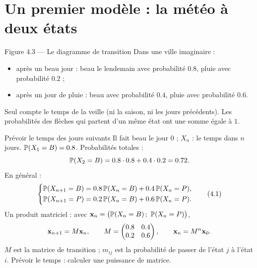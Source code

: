 \section{Un premier modèle : la météo à deux états}

\begin{frame}{Figure 4.3 --- Le diagramme de transition}
  \small Dans une ville imaginaire :
  \begin{itemize}
    \item après un beau jour : beau le lendemain avec probabilité
      $\num{0.8}$, pluie avec probabilité $\num{0.2}$ ;
    \item après un jour de pluie : beau avec probabilité $\num{0.4}$,
      pluie avec probabilité $\num{0.6}$.
  \end{itemize}
  Seul compte le temps de la veille (ni la saison, ni les jours
  précédents).
  \small Les probabilités des flèches qui partent d'un même état ont une
  somme égale à $1$.
\end{frame}

\begin{frame}{Prévoir le temps des jours suivants}
  \small Il fait beau le jour $0$ ; $X_n$ : le temps dans $n$ jours.
  $\mathbb{P}\mathopen{}\left(X_1=B\right)\mathclose{}=\num{0.8}$. Probabilités totales :
  \[
    \mathbb{P}\mathopen{}\left(X_2=B\right)\mathclose{} = \num{0.8}\cdot\num{0.8}+\num{0.4}\cdot\num{0.2} = \num{0.72}.
  \]
  En général :
  \[
    \left\{\begin{aligned}
      \mathbb{P}\mathopen{}\left(X_{n+1}=B\right)\mathclose{} &= \num{0.8}\,\mathbb{P}\mathopen{}\left(X_n=B\right)\mathclose{}+\num{0.4}\,\mathbb{P}\mathopen{}\left(X_n=P\right)\mathclose{},\\
      \mathbb{P}\mathopen{}\left(X_{n+1}=P\right)\mathclose{} &= \num{0.2}\,\mathbb{P}\mathopen{}\left(X_n=B\right)\mathclose{}+\num{0.6}\,\mathbb{P}\mathopen{}\left(X_n=P\right)\mathclose{}.
    \end{aligned}\right. \tag{4.1}
  \]
  Un produit matriciel : avec $\vec x_n=\big(\P{X_n=B}\,;\ \P{X_n=P}\big)$,
  \[
    \mathbf{x}_{n+1} = M\mathbf{x}_n,\qquad
    M = \begin{pmatrix}\num{0.8} & \num{0.4}\\ \num{0.2} & \num{0.6}\end{pmatrix},\qquad
    \mathbf{x}_n = M^n\mathbf{x}_0 .
  \]
  $M$ est la matrice de transition ; $m_{ij}$ est la probabilité de
  passer de l'état $j$ à l'état $i$. Prévoir le temps : calculer une
  puissance de matrice.
\end{frame}

